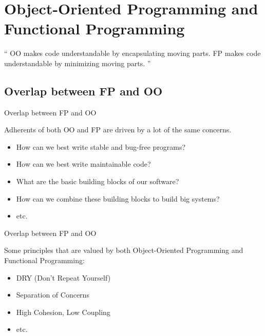 \documentclass{beamer}
\begin{document}
\section{Object-Oriented Programming and Functional Programming}

\begin{frame}

  \begin{exampleblock}{}
    {\Large ``
      OO makes code understandable by encapsulating
      moving parts.
      FP makes code understandable by minimizing moving
      parts.
      ''}
    \vskip5mm
    \hspace*{}
  \end{exampleblock}

\end{frame}

\subsection{Overlap between FP and OO}

\begin{frame}{Overlap between FP and OO}

  {\Large Adherents of both OO and FP are driven by a lot of the same
    concerns.}

  \begin{itemize}[<+->]
  \item {\Large How can we best write stable and bug-free programs?}
  \item {\Large How can we best write maintainable code?}
  \item {\Large What are the basic building blocks of our software?}
  \item {\Large How can we combine these building blocks to build big
    systems?}
  \item etc.
  \end{itemize}

\end{frame}


\begin{frame}{Overlap between FP and OO}

  {\Large Some principles that are valued by both Object-Oriented
    Programming and Functional Programming:}

  \begin{itemize}[<+->]
  \item DRY (Don't Repeat Yourself)
  \item Separation of Concerns
  \item High Cohesion, Low Coupling
  \item etc.
  \end{itemize}

\end{frame}
\end{document}
